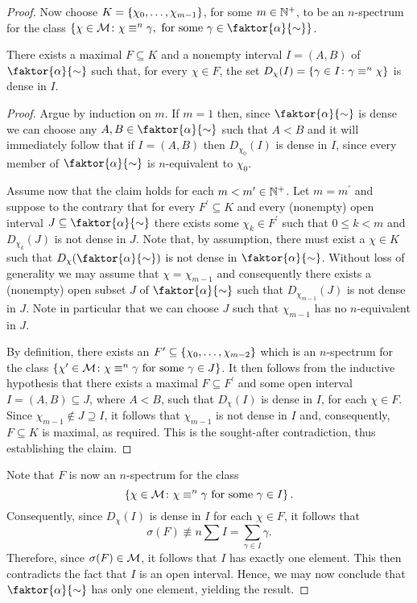 \begin{proof}
	Now choose $K=\left\lbrace \chi_0,\dotsc,\chi_{m-1}\right\rbrace$, for some $m\in\mathbb{N}^{+}$, to be an $n$-spectrum for the class $\setbuild{\chi\in\M}{\chi\nequiv{n}\gamma,\text{ for some }\gamma\in\faktor{\alpha}{\sim}}$.
	\begin{claim}
		There exists a maximal $F\subseteq K$ and a nonempty interval $I=(A,B)$ of $\faktor{\alpha}{\sim}$ such that, for every $\chi\in F$, the set $D_\chi(I)=\left\lbrace \gamma\in I\colon \gamma\equiv^{n}\chi \right\rbrace$ is dense in $I$.
	\end{claim}
	\begin{proof}
		Argue by induction on $m$.  If $m=1$ then, since $\faktor{\alpha}{\sim}$ is dense we can choose any $A,B\in\faktor{\alpha}{\sim}$ such that $A<B$ and it will immediately follow that if $I=(A,B)$ then $D_{\chi_0}(I)$ is dense in $I$, since every member of $\faktor{\alpha}{\sim}$ is $n$-equivalent to $\chi_0$.

		Assume now that the claim holds for each $m<m^\prime\in\mathbb{N}^{+}$.  Let $m=m^\prime$ and suppose to the contrary that for every $F^\prime\subseteq K$ and every (nonempty) open interval $J\subseteq\faktor{\alpha}{\sim}$ there exists some $\chi_k\in F^\prime$ such that $0\leq k<m$ and $D_{\chi_k}(J)$ is not dense in $J$.  Note that, by assumption, there must exist a $\chi\in K$ such that $D_{\chi}(\faktor{\alpha}{\sim})$ is not dense in $\faktor{\alpha}{\sim}$.  Without loss of generality we may assume that $\chi=\chi_{m-1}$ and consequently there exists a (nonempty) open subset $J$ of $\faktor{\alpha}{\sim}$ such that $D_{\chi_{m-1}}(J)$ is not dense in $J$.  Note in particular that we can choose $J$ such that $\chi_{m-1}$ has no $n$-equivalent in $J$.

		By definition, there exists an $F^\prime\subseteq\left\lbrace \chi_0,\dotsc,\chi_{m-2}\right\rbrace$ which is an $n$-spectrum for the class $\left\lbrace \chi^\prime\in\mathcal{M}\colon \chi\equiv^{n}\gamma\text{ for some }\gamma\in J \right\rbrace$.  It then follows from the inductive hypothesis that there exists a maximal $F\subseteq F^\prime$ and some open interval $I=(A,B)\subseteq J$, where $A<B$, such that $D_{\chi}(I)$ is dense in $I$, for each $\chi\in F$.  Since $\chi_{m-1}\notin J\supseteq I$, it follows that $\chi_{m-1}$ is not dense in $I$ and, consequently, $F\subseteq K$ is maximal, as required.  This is the sought-after contradiction, thus establishing the claim.
	\end{proof}
	Note that $F$ is now an $n$-spectrum for the class
	\begin{equation}
		\left\lbrace \chi\in\mathcal{M}\colon \chi\equiv^{n}\gamma\text{ for some }\gamma\in I \right\rbrace.
	\end{equation}
	Consequently, since $D_{\chi}(I)$ is dense in $I$ for each $\chi\in F$, it follows that
	\begin{equation}
		\sigma(F)\nequiv{n}\sum I=\sum_{\gamma\in I}\gamma.
	\end{equation}
	Therefore, since $\sigma(F)\in\mathcal{M}$, it follows that $I$ has exactly one element.  This then contradicts the fact that $I$ is an open interval.  Hence, we may now conclude that $\faktor{\alpha}{\sim}$ has only one element, yielding the result.

\end{proof}

